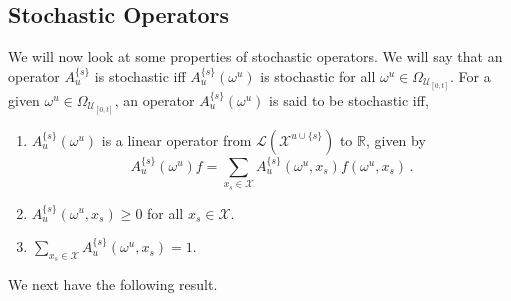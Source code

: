 \documentclass[a4paper,reqno]{amsart}
\newcommand{\states}{\mathcal{X}}
\newcommand{\gambles}{\mathcal{L}}
\begin{document}

\subsection{Stochastic Operators}

We will now look at some properties of stochastic operators. We will say that an operator $A_u^{\{s\}}$ is stochastic iff $A_u^{\{s\}}(\omega^u)$ is stochastic for all $\omega^u\in\Omega_{\mathcal{U}_{[0,t]}}$. For a given $\omega^u\in\Omega_{\mathcal{U}_{[0,t]}}$, an operator $A_u^{\{s\}}(\omega^u)$ is said to be stochastic iff, 
\begin{enumerate}
\item $A_u^{\{s\}}(\omega^u)$ is a linear operator from $\gambles(\states^{u\cup \{s\}})$ to $\mathbb{R}$, given by 
\begin{equation*}
A_u^{\{s\}}(\omega^u)f = \sum_{x_s\in\states}A_u^{\{s\}}(\omega^u,x_s)f(\omega^u,x_s)\,.
\end{equation*}
\item $A_u^{\{s\}}(\omega^u, x_s) \geq 0 $ for all $x_s\in\states$.
\item $\sum_{x_s\in\states}A_u^{\{s\}}(\omega^u,x_s) = 1$.
\end{enumerate}
We next have the following result.
\end{document}

